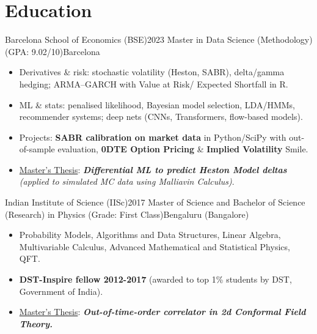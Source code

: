 \section*{Education}
\vspace{2pt}
  \resumeSubHeadingListStart
    \resumeSubheading
  {Barcelona School of Economics (BSE)}{2023}
  {Master in Data Science (Methodology) (GPA: 9.02/10)}{Barcelona}
\begin{itemize}[leftmargin=*, noitemsep=2, partopsep=0pt]
\vspace{3pt}
    \item Derivatives \& risk: stochastic volatility (Heston, SABR), delta/gamma hedging; ARMA–GARCH with Value at Risk/ Expected Shortfall in R.
\vspace{1pt}    
    \item ML \& stats: penalised likelihood, Bayesian model selection, LDA/HMMs, recommender systems; deep nets (CNNs, Transformers, flow-based models).
\vspace{1pt}    
    \item Projects: \textbf{SABR calibration on market data} in Python/SciPy with out-of-sample evaluation, \textbf{0DTE Option Pricing} \& \textbf{Implied Volatility} Smile.
\vspace{1pt}
    \item \underline{Master's Thesis}: \textit{\textbf{Differential ML to predict Heston Model deltas} (applied to simulated MC data using Malliavin Calculus)}. 

\end{itemize}    


    \resumeSubheading
      {Indian Institute of Science (IISc)}{2017}
      {Master of Science and Bachelor of Science (Research) in Physics  (Grade: First Class)}{Bengaluru (Bangalore)}
\begin{itemize}[leftmargin=*, noitemsep=2, partopsep=0pt]
\vspace{3pt}
    \item Probability Models, Algorithms and Data Structures, Linear Algebra, Multivariable Calculus, Advanced Mathematical and Statistical Physics, QFT.
\vspace{1pt}
    \item \textbf{DST-Inspire fellow 2012-2017} (awarded to top 1\% students by DST, Government of India).
\vspace{1pt}
    \item \underline{Master's Thesis}: \textit{\textbf{Out-of-time-order correlator in 2d Conformal Field Theory.}} 
\end{itemize}    

